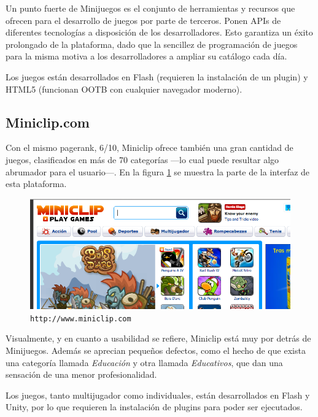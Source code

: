 Un punto fuerte de Minijuegos es el conjunto de herramientas y recursos que ofrecen para el desarrollo de juegos por parte de terceros. Ponen \acs{API}s de diferentes tecnologías a disposición de los desarrolladores. Esto garantiza un éxito prolongado de la plataforma, dado que la sencillez de programación de juegos para la misma motiva a los desarrolladores a ampliar su catálogo cada día.

Los juegos están desarrollados en Flash (requieren la instalación de un plugin) y HTML5 (funcionan \acs{OOTB} con cualquier navegador moderno).

\subsection*{Miniclip.com}

Con el mismo pagerank, 6/10, Miniclip ofrece también una gran cantidad de juegos, clasificados en más de 70 categorías ---lo cual puede resultar algo abrumador para el usuario---. En la figura \ref{fig::miniclip} se muestra la parte de la interfaz de esta plataforma.

\begin{figure}[h]
  \begin{center}
    \includegraphics[width=\textwidth]{images/miniclip.png}
    \caption{{\tt http://www.miniclip.com}}
    \label{fig::miniclip}
  \end{center}
\end{figure}

Visualmente, y en cuanto a usabilidad se refiere, Miniclip está muy por detrás de Minijuegos. Además se aprecian pequeños defectos, como el hecho de que exista una categoría llamada {\it Educación} y otra llamada {\it Educativos}, que dan una sensación de una menor profesionalidad.

Los juegos, tanto multijugador como individuales, están desarrollados en Flash y Unity, por lo que requieren la instalación de plugins para poder ser ejecutados.

